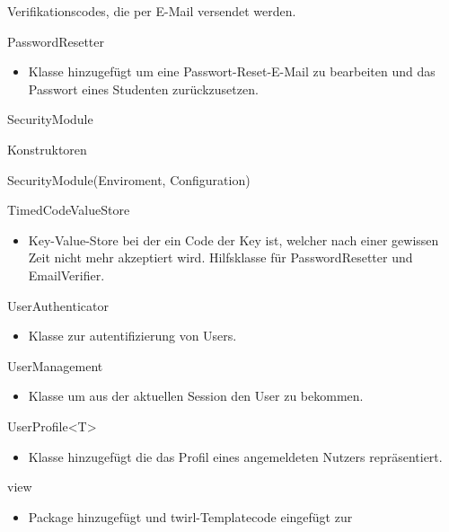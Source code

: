 \documentclass[parskip=full]{scrartcl}
\newcommand{\code}[1]{{\ttfamily #1}}
\begin{document}
\begin{itemPackage}
\begin{itemClass}
\begin{itemize}
	  Verifikationscodes, die per E-Mail versendet werden.
	\end{itemize}
\item PasswordResetter
 \begin{itemize}
	  \item Klasse hinzugefügt um eine Passwort-Reset-E-Mail zu bearbeiten und das
	  Passwort eines Studenten zurückzusetzen.
	\end{itemize}
\item SecurityModule
\begin{itemClassSub}
\item Konstruktoren
\begin{itemPlus}
\item SecurityModule(Enviroment, Configuration)
\end{itemPlus}
\end{itemClassSub}
\item TimedCodeValueStore
\item \begin{itemize}
	  \item Key-Value-Store bei der ein Code der Key ist, welcher nach einer
	  gewissen Zeit nicht mehr akzeptiert wird. Hilfsklasse für
	  \code{PasswordResetter} und \code{EmailVerifier}.
	\end{itemize}
\item UserAuthenticator
\item \begin{itemize}
	  \item Klasse zur autentifizierung von \code{Users}.
	\end{itemize}
\item UserManagement
\item \begin{itemize}
	  \item Klasse um aus der aktuellen Session den \code{User} zu bekommen.
	\end{itemize}
\item UserProfile<T>
\item \begin{itemize}
	  \item Klasse hinzugefügt die das Profil eines angemeldeten Nutzers
	  repräsentiert.
	\end{itemize}
\end{itemClass}
\item view
\begin{itemize}
  \item Package hinzugefügt und \code{twirl}-Templatecode eingefügt zur

\end{itemize}
\end{itemPackage}
\end{document}
